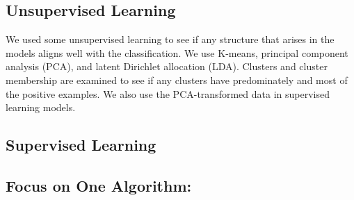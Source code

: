 \subsection{Unsupervised Learning}
We used some unsupervised learning to see if any structure that arises in the models aligns well with the classification.  We use K-means, principal component analysis (PCA), and latent Dirichlet allocation (LDA).  Clusters and cluster membership are examined to see if any clusters have predominately and most of the positive examples. We also use the PCA-transformed data in supervised learning models.




\subsection{Supervised Learning}






\subsection{Focus on One Algorithm: }